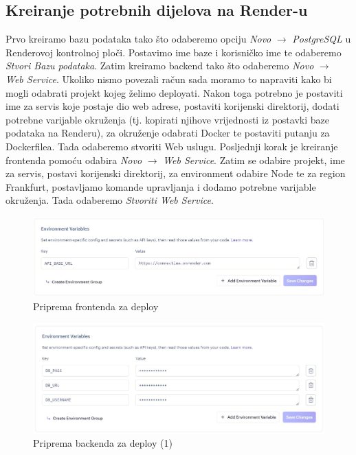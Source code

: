 			
			
			\subsection{Kreiranje potrebnih dijelova na Render-u}
			
			Prvo kreiramo bazu podataka tako što odaberemo opciju \textit{Novo} $\xrightarrow{}$ \textit{PostgreSQL} u Renderovoj kontrolnoj ploči. Postavimo ime baze i korisničko ime te odaberemo \textit{Stvori Bazu podataka}. Zatim kreiramo backend tako što odaberemo \textit{Novo} $\xrightarrow{}$ \textit{Web Service}. Ukoliko nismo povezali račun sada moramo to napraviti kako bi mogli odabrati projekt kojeg želimo deployati. Nakon toga potrebno je postaviti ime za servis koje postaje dio web adrese, postaviti korijenski direktorij, dodati potrebne varijable okruženja (tj. kopirati njihove vrijednosti iz postavki baze podataka na Renderu), za okruženje odabrati Docker te postaviti putanju za Dockerfilea. Tada odaberemo stvoriti Web uslugu. Posljednji korak je kreiranje frontenda pomoću odabira \textit{Novo} $\xrightarrow{}$ \textit{Web Service}. Zatim se odabire projekt, ime za servis, postavi korijenski direktorij, za environment odabire Node te za region Frankfurt, postavljamo komande upravljanja i dodamo potrebne varijable okruženja. Tada odaberemo \textit{Stvoriti Web Service}.
			
			
			\begin{figure}[H]
				\includegraphics[width=\textwidth]{slike/Priprema_frontenda.jpg} 
				\centering
				\vspace{-0.2cm}
				\caption{Priprema frontenda za deploy}
				\label{front}
			\end{figure}
			
			\begin{figure}[H]
				\includegraphics[width=\textwidth]{slike/Priprema_backenda.jpg} 
				\centering
				\vspace{-0.2cm}
				\caption{Priprema backenda za deploy (1)}
				\label{back}
			\end{figure}
			
